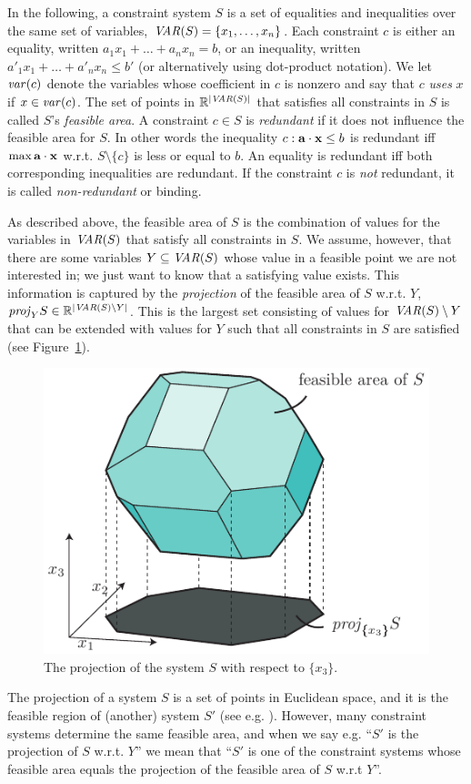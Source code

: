 In the following, a constraint system $S$ is a set of equalities and inequalities over the same set of variables, $\mathit{VAR}(S)=\{x_1,\ldots, x_n\}$. Each constraint $c$ is either an equality, written $a_1x_1 + \ldots +a_nx_n = b$, or an inequality, written $a'_1x_1 + \ldots +a'_nx_n\leq b'$ (or alternatively using dot-product notation). We let $\mathit{var}(c)$ denote the variables whose coefficient in $c$ is nonzero and say that $c$ \emph{uses} $x$ if $x\in \mathit{var}(c)$. The set of points in $\mathbb{R}^{|\mathit{VAR}(S)|}$ that satisfies all constraints in $S$ is called $S$'s \emph{feasible area}. A constraint $c\in S$ is \emph{redundant} if it does not influence the feasible area for $S$. In other words the inequality $c: \mathbf{a}\cdot\mathbf{x}\leq b$ is redundant iff $\max \mathbf{a}\cdot\mathbf{x}$ w.r.t. $S\setminus\{c\}$ is less or equal to $b$. An equality is redundant iff both corresponding inequalities are redundant. If the constraint $c$ is \emph{not} redundant, it is called \emph{non-redundant} or binding.

As described above, the feasible area of $S$ is the combination of values for the variables in $\mathit{VAR}(S)$ that satisfy all constraints in $S$. We assume, however, that there are some variables $Y\subseteq \mathit{VAR}(S)$ whose value in a feasible point we are not interested in; we just want to know that a satisfying value exists. This information is captured by the \emph{projection} of the feasible area of $S$ w.r.t. $Y$, $\mathit{proj}_YS\in\mathbb{R}^{|\mathit{VAR}(S)\setminus Y|}$. This is the largest set consisting of values for $\mathit{VAR}(S)\setminus Y$ that can be extended with values for $Y$ such that all constraints in $S$ are satisfied (see Figure~\ref{fig:proj}). 
\begin{figure}
	\centering
		\includegraphics[scale=0.8]{figures/projection2.pdf}
	\caption{The projection of the system $S$ with respect to $\{x_3\}$.}
	\label{fig:proj}
\end{figure}
The projection of a system $S$ is a set of points in Euclidean space, and it is the feasible region of (another) system $S'$ (see e.g. \cite{ziegler95}). However, many constraint systems determine the same feasible area, and when we say e.g. ``$S'$ is the projection of $S$ w.r.t. $Y$'' we mean that ``$S'$ is one of the constraint systems whose feasible area equals the projection of the feasible area of $S$ w.r.t $Y$''.

